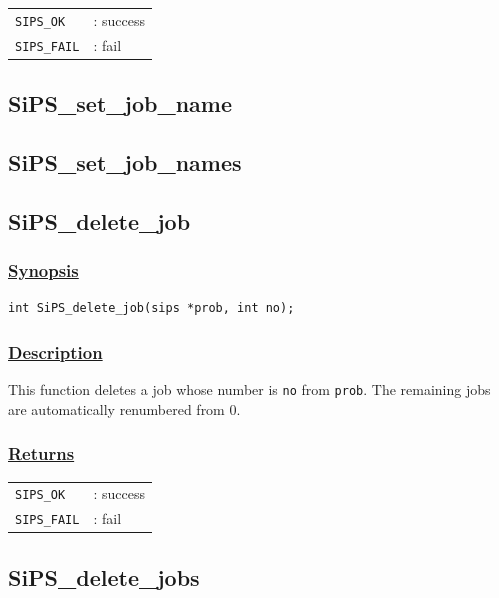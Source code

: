 \documentclass[a4paper]{book}
\begin{document}
\begin{tabular}{ll}
  \verb+SIPS_OK+  &: success\\
  \verb+SIPS_FAIL+&: fail\\
\end{tabular}


\hypertarget{SiPS_set_job_name}{%
\subsection{SiPS\_set\_job\_name}
}

\hypertarget{SiPS_set_job_names}{%
\subsection{SiPS\_set\_job\_names}
}
\fi

\hypertarget{SiPS_delete_job}{%
\subsection{SiPS\_delete\_job}
}

\subsubsection{\underline{Synopsis}}

\begin{verbatim}
int SiPS_delete_job(sips *prob, int no);
\end{verbatim}

\subsubsection{\underline{Description}}

This function deletes a job whose number is \verb+no+ from \verb+prob+.
The remaining jobs are automatically renumbered from $0$.

\subsubsection{\underline{Returns}}

\begin{tabular}{ll}
  \verb+SIPS_OK+  &: success\\
  \verb+SIPS_FAIL+&: fail\\
\end{tabular}

\hypertarget{SiPS_delete_jobs}{%
\subsection{SiPS\_delete\_jobs}
}
\end{document}
